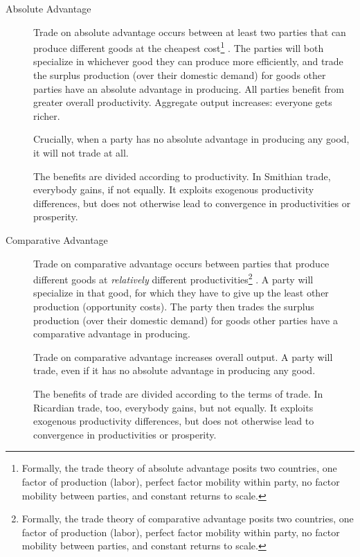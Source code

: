 \begin{description}
	\item[Absolute Advantage] \label{it:absolute_advantage}Trade on absolute advantage occurs between at least two parties that can produce different goods at the cheapest cost\footnote{
		Formally, the trade theory of absolute advantage posits two countries, one factor of production (labor), perfect factor mobility within party, no factor mobility between parties, and constant returns to scale.} \citep{Smith-1776-lq}. The parties will both specialize in whichever good they can produce more efficiently, and trade the surplus production (over their domestic demand) for goods other parties have an absolute advantage in producing. All parties benefit from greater overall productivity. Aggregate output increases: everyone gets richer. 

	Crucially, when a party has no absolute advantage in producing any good, it will not trade at all. 

	The benefits are divided according to productivity. %
	In Smithian trade, everybody gains, if not equally. It exploits exogenous productivity differences, but does not otherwise lead to convergence in productivities or prosperity.

	\item[Comparative Advantage]\label{it:comparative_advantage} Trade on comparative advantage occurs between parties that produce different goods at \emph{relatively} different productivities\footnote{
		Formally, the trade theory of comparative advantage posits two countries, one factor of production (labor), perfect factor mobility within party, no factor mobility between parties, and constant returns to scale.} 
	\citep{Ricardo1817}. A party will specialize in that good, for which they have to give up the least other production (opportunity costs). The party then trades the surplus production (over their domestic demand) for goods other parties have a comparative advantage in producing. 
	
	Trade on comparative advantage increases overall output. 
	A party will trade, even if it has no absolute advantage in producing any good.

	The benefits of trade are divided according to the terms of trade. %
	In Ricardian trade, too, everybody gains, but not equally. It exploits exogenous productivity differences, but does not otherwise lead to convergence in productivities or prosperity.


\end{description}
